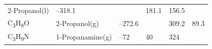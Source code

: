 \documentclass[
  9pt,
]{extbook}
\theoremstyle{definition}
\theoremstyle{definition}
\theoremstyle{definition}
\theoremstyle{remark}
\begin{document}
\begin{longtable}[]{@{}llllll@{}}
\begin{minipage}[t]{0.17\columnwidth}
2-Propanol(l)\strut
\end{minipage} & \begin{minipage}[t]{0.15\columnwidth}\raggedright
--318.1\strut
\end{minipage} & \begin{minipage}[t]{0.15\columnwidth}\raggedright
\strut
\end{minipage} & \begin{minipage}[t]{0.14\columnwidth}\raggedright
181.1\strut
\end{minipage} & \begin{minipage}[t]{0.14\columnwidth}\raggedright
156.5\strut
\end{minipage}\tabularnewline
\begin{minipage}[t]{0.07\columnwidth}\raggedright
C\textsubscript{3}H\textsubscript{8}O\strut
\end{minipage} & \begin{minipage}[t]{0.17\columnwidth}\raggedright
2-Propanol(g)\strut
\end{minipage} & \begin{minipage}[t]{0.15\columnwidth}\raggedright
--272.6\strut
\end{minipage} & \begin{minipage}[t]{0.15\columnwidth}\raggedright
\strut
\end{minipage} & \begin{minipage}[t]{0.14\columnwidth}\raggedright
309.2\strut
\end{minipage} & \begin{minipage}[t]{0.14\columnwidth}\raggedright
89.3\strut
\end{minipage}\tabularnewline
\begin{minipage}[t]{0.07\columnwidth}\raggedright
C\textsubscript{3}H\textsubscript{9}N\strut
\end{minipage} & \begin{minipage}[t]{0.17\columnwidth}\raggedright
1-Propanamine(g)\strut
\end{minipage} & \begin{minipage}[t]{0.15\columnwidth}\raggedright
--72\strut
\end{minipage} & \begin{minipage}[t]{0.15\columnwidth}\raggedright
40\strut
\end{minipage} & \begin{minipage}[t]{0.14\columnwidth}\raggedright
324\strut
\end{minipage} & \begin{minipage}[t]{0.14\columnwidth}\raggedright

\end{minipage}
\end{longtable}
\end{document}

